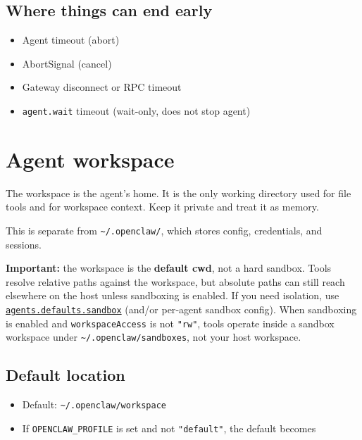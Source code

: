 \subsection{Where things can end early}


\begin{itemize}
  \item Agent timeout (abort)
  \item AbortSignal (cancel)
  \item Gateway disconnect or RPC timeout
  \item \texttt{agent.wait} timeout (wait-only, does not stop agent)
\end{itemize}



\clearpage

\section{Agent workspace}


The workspace is the agent's home. It is the only working directory used for
file tools and for workspace context. Keep it private and treat it as memory.

This is separate from \texttt{\textasciitilde{}/.openclaw/}, which stores config, credentials, and
sessions.

\textbf{Important:} the workspace is the \textbf{default cwd}, not a hard sandbox. Tools
resolve relative paths against the workspace, but absolute paths can still reach
elsewhere on the host unless sandboxing is enabled. If you need isolation, use
\href{/gateway/sandboxing}{\texttt{agents.defaults.sandbox}} (and/or per‑agent sandbox config).
When sandboxing is enabled and \texttt{workspaceAccess} is not \texttt{"rw"}, tools operate
inside a sandbox workspace under \texttt{\textasciitilde{}/.openclaw/sandboxes}, not your host workspace.

\subsection{Default location}


\begin{itemize}
  \item Default: \texttt{\textasciitilde{}/.openclaw/workspace}
  \item If \texttt{OPENCLAW\_PROFILE} is set and not \texttt{"default"}, the default becomes
\end{itemize}

